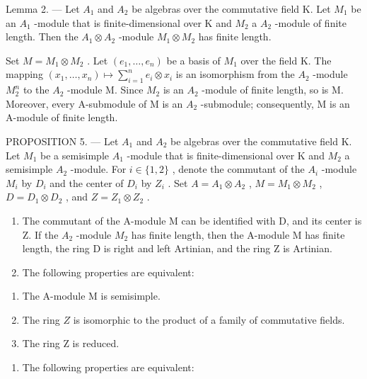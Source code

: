 Lemma 2. --- Let \(A_{1}\) and \(A_{2}\) be algebras over the commutative field K. Let \(M_{1}\) be an \(A_{1}\) -module that is finite-dimensional over K and \(M_{2}\) a \(A_{2}\) -module of finite length. Then the \(A_{1} \otimes A_{2}\) -module \(M_{1} \otimes M_{2}\) has finite length.

Set \(M = M_{1} \otimes M_{2}\) . Let \((e_{1}, \ldots, e_{n})\) be a basis of \(M_{1}\) over the field K. The mapping \((x_{1}, \ldots, x_{n}) \mapsto \sum_{i=1}^{n} e_{i} \otimes x_{i}\) is an isomorphism from the \(A_{2}\) -module \(M_{2}^{n}\) to the \(A_{2}\) -module M. Since \(M_{2}\) is an \(A_{2}\) -module of finite length, so is M. Moreover, every A-submodule of M is an \(A_{2}\) -submodule; consequently, M is an A-module of finite length.

PROPOSITION 5. --- Let \(A_{1}\) and \(A_{2}\) be algebras over the commutative field K. Let \(M_{1}\) be a semisimple \(A_{1}\) -module that is finite-dimensional over K and \(M_{2}\) a semisimple \(A_{2}\) -module. For \(i \in \{1,2\}\) , denote the commutant of the \(A_{i}\) -module \(M_{i}\) by \(D_{i}\) and the center of \(D_{i}\) by \(Z_{i}\) . Set \(A = A_{1} \otimes A_{2}\) , \(M = M_{1} \otimes M_{2}\) , \(D = D_{1} \otimes D_{2}\) , and \(Z = Z_{1} \otimes Z_{2}\) .

\begin{enumerate}
\def\labelenumi{\alph{enumi})}
\item
  The commutant of the A-module M can be identified with D, and its center is Z. If the \(A_{2}\) -module \(M_{2}\) has finite length, then the A-module M has finite length, the ring D is right and left Artinian, and the ring Z is Artinian.
\item
  The following properties are equivalent:
\end{enumerate}

\begin{enumerate}
\def\labelenumi{(\roman{enumi})}
\item
  The A-module M is semisimple.
\item
  The ring \(Z\) is isomorphic to the product of a family of commutative fields.
\item
  The ring Z is reduced.
\end{enumerate}

\begin{enumerate}
\def\labelenumi{\alph{enumi})}
\setcounter{enumi}{2}
\tightlist
\item
  The following properties are equivalent:
\end{enumerate}


